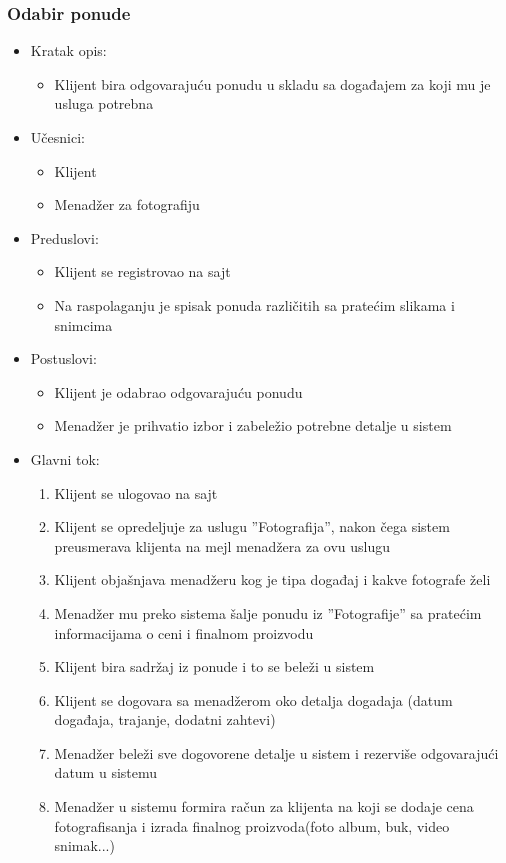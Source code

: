 \documentclass[a4paper]{article}
\begin{document}
\subsubsection{Odabir ponude}
\begin{itemize}
    \item Kratak opis: 
    \begin{itemize}
        \item Klijent bira odgovarajuću ponudu u skladu sa događajem za koji mu je usluga potrebna
    \end{itemize}
    \item Učesnici:
        \begin{itemize}
        \item Klijent
        \item Menadžer za fotografiju
    \end{itemize}
    \item Preduslovi:
        \begin{itemize}
            \item Klijent se registrovao na sajt
            \item Na raspolaganju je spisak ponuda različitih sa pratećim slikama i snimcima
        \end{itemize}
    \item Postuslovi:
        \begin{itemize}
            \item Klijent je odabrao odgovarajuću ponudu
            \item Menadžer je prihvatio izbor i zabeležio potrebne detalje u sistem
        \end{itemize}
    \item Glavni tok:
        \begin{enumerate}
            \item Klijent se ulogovao na sajt
            \item Klijent se opredeljuje za uslugu ''Fotografija'', nakon čega sistem preusmerava klijenta na mejl menadžera za ovu uslugu
            \item Klijent objašnjava menadžeru kog je tipa događaj i kakve fotografe želi
            \item Menadžer mu preko sistema šalje ponudu iz ''Fotografije'' sa pratećim informacijama o ceni i finalnom proizvodu 
            \item Klijent bira sadržaj iz ponude i to se beleži u sistem 
            \item Klijent se dogovara sa menadžerom oko detalja dogadaja (datum događaja, trajanje, dodatni zahtevi)
            \item Menadžer beleži sve dogovorene detalje u sistem i rezerviše odgovarajući datum u sistemu
            \item Menadžer u sistemu formira račun za klijenta na koji se dodaje cena fotografisanja i izrada finalnog proizvoda(foto album, buk, video snimak...)
        \end{enumerate}
        

\end{itemize}
\end{document}
